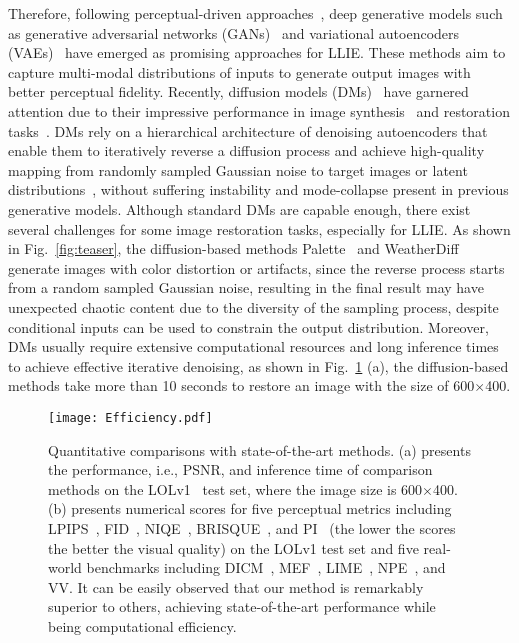 Therefore, following perceptual-driven approaches~\cite{VGGLoss,perceptual_driven}, deep generative models such as generative adversarial networks (GANs)~\cite{EnlightenGAN,low_light_GAN} and variational autoencoders (VAEs)~\cite{LUD_VAE} have emerged as promising approaches for LLIE. These methods aim to capture multi-modal distributions of inputs to generate output images with better perceptual fidelity. Recently, diffusion models (DMs)~\cite{diffusion_1,diffusion_2,diffusion_3} have garnered attention due to their impressive performance in image synthesis~\cite{ddpm,ddim} and restoration tasks~\cite{Refusion,D2C-SR}. DMs rely on a hierarchical architecture of denoising autoencoders that enable them to iteratively reverse a diffusion process and achieve high-quality mapping from randomly sampled Gaussian noise to target images or latent distributions~\cite{latent_diffusion}, without suffering instability and mode-collapse present in previous generative models. Although standard DMs are capable enough, there exist several challenges for some image restoration tasks, especially for LLIE. As shown in Fig.~\ref{fig:teaser}, the diffusion-based methods Palette~\cite{palette} and WeatherDiff~\cite{weatherdiff} generate images with color distortion or artifacts, since the reverse process starts from a random sampled Gaussian noise, resulting in the final result may have unexpected chaotic content due to the diversity of the sampling process, despite conditional inputs can be used to constrain the output distribution. Moreover, DMs usually require extensive computational resources and long inference times to achieve effective iterative denoising, as shown in Fig.~\ref{fig:efficiency} (a), the diffusion-based methods take more than 10 seconds to restore an image with the size of 600$\times$400.
\begin{figure}[!t]
	\centering
	\texttt{[image: Efficiency.pdf]}
	\caption{Quantitative comparisons with state-of-the-art methods. (a) presents the performance, i.e., PSNR, and inference time of comparison methods on the LOLv1~\cite{RetinexNet} test set, where the image size is 600$\times$400. (b) presents numerical scores for five perceptual metrics including LPIPS~\cite{LPIPS}, FID~\cite{fid}, NIQE~\cite{NIQE}, BRISQUE~\cite{BRISQUE}, and PI~\cite{PI} (the lower the scores the better the visual quality) on the LOLv1 test set and five real-world benchmarks including DICM~\cite{DICM}, MEF~\cite{MEF}, LIME~\cite{LIME}, NPE~\cite{NPE}, and VV. It can be easily observed that our method is remarkably superior to others, achieving state-of-the-art performance while being computational efficiency.}
	\label{fig:efficiency}
\end{figure}

